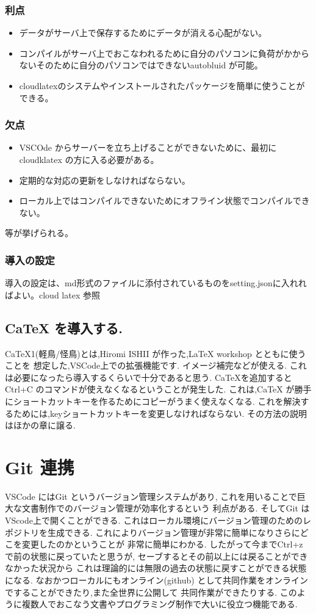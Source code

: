 \documentclass{ltjsarticle}
\begin{document}
\subsubsection*{利点}
\begin{itemize}
  \item データがサーバ上で保存するためにデータが消える心配がない。
  \item コンパイルがサーバ上でおこなわれるために自分のパソコンに負荷がかからないそのために自分のパソコンではできないautobluid が可能。
  \item cloudlatexのシステムやインストールされたパッケージを簡単に使うことができる。
\end{itemize}
\subsubsection*{欠点}
\begin{itemize}
  \item VSCOde からサーバーを立ち上げることができないために、最初にcloudklatex の方に入る必要がある。
  \item 定期的な対応の更新をしなければならない。
  \item ローカル上ではコンパイルできないためにオフライン状態でコンパイルできない。
\end{itemize}
等が挙げられる。
\subsubsection{導入の設定}
導入の設定は、md形式のファイルに添付されているものをsetting.jsonに入れればよい。cloud latex 参照
\subsection{CaTeX を導入する.}
CaTeX1(軽鳥/怪鳥)とは,Hiromi ISHII が作った,LaTeX workshop とともに使うことを
想定した,VSCode上での拡張機能です.
イメージ補完などが使える.
これは必要になったら導入するくらいで十分であると思う.
CaTeXを追加するとCtrl+C のコマンドが使えなくなるということが発生した.
これは,CaTeX が勝手にショートカットキーを作るためにコピーがうまく使えなくなる.
これを解決するためには,keyショートカットキーを変更しなければならない.
その方法の説明はほかの章に譲る.


\section{Git 連携}
VSCode にはGit というバージョン管理システムがあり,
これを用いることで巨大な文書制作でのバージョン管理が効率化するという
利点がある.
そしてGit はVScode上で開くことができる.
これはローカル環境にバージョン管理のためのレポジトリを生成できる.
これによりバージョン管理が非常に簡単になりさらにどこを変更したのかということが
非常に簡単にわかる.
したがって今までCtrl+z で前の状態に戻っていたと思うが,
セーブするとその前以上には戻ることができなかった状況から
これは理論的には無限の過去の状態に戻すことができる状態になる.
なおかつローカルにもオンライン(github)
として共同作業をオンラインですることができたり,また全世界に公開して
共同作業ができたりする.
このように複数人でおこなう文書やプログラミング制作で大いに役立つ機能である.
\end{document}
